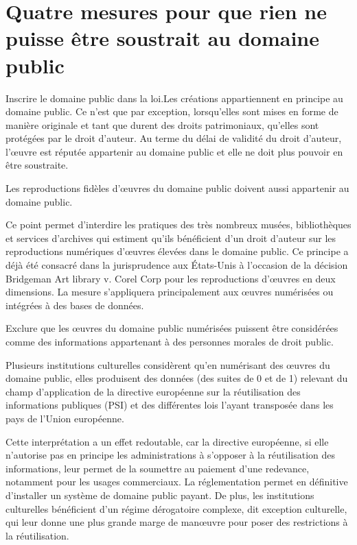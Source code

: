 \section{Quatre mesures pour que rien ne puisse être soustrait au domaine public}
\begin{mesure}
Inscrire le domaine public dans la loi.Les créations appartiennent en principe au domaine public. Ce n'est que par exception, lorsqu'elles sont mises en forme de manière originale et tant que durent des droits patrimoniaux, qu'elles sont protégées par le droit d'auteur. Au terme du délai de validité du droit d’auteur, l’œuvre est réputée appartenir au domaine public et elle ne doit plus pouvoir en être soustraite.  
\end{mesure}

\begin{mesure}
Les reproductions fidèles d’œuvres du domaine public doivent aussi appartenir au domaine public.
\end{mesure}

Ce point permet d’interdire les pratiques des très nombreux musées, bibliothèques et services d’archives qui estiment qu’ils bénéficient d’un droit d’auteur sur les reproductions numériques d’œuvres élevées dans le domaine public. Ce principe a déjà été consacré dans la jurisprudence aux États-Unis à l’occasion de la décision Bridgeman Art library v. Corel Corp pour les reproductions d'œuvres en deux dimensions. La mesure s’appliquera principalement aux œuvres numérisées ou intégrées à des bases de données.

\begin{mesure}
Exclure que les œuvres du domaine public numérisées puissent être considérées comme des informations appartenant à des personnes morales de droit public.
\end{mesure}

Plusieurs institutions culturelles considèrent qu’en numérisant des œuvres du domaine public, elles produisent des données (des suites de 0 et de 1) relevant du champ d’application de la directive européenne sur la réutilisation des informations publiques (PSI) et des différentes lois l'ayant transposée dans les pays de l'Union européenne.

Cette interprétation a un effet redoutable, car la directive européenne, si elle n’autorise pas en principe les administrations à s’opposer à la réutilisation des informations, leur permet de la soumettre au paiement d’une redevance, notamment pour les usages commerciaux. La réglementation permet en définitive d’installer un système de domaine public payant. De plus, les institutions culturelles bénéficient d’un régime dérogatoire complexe, dit exception culturelle, qui leur donne une plus grande marge de manœuvre pour poser des restrictions à la réutilisation.

